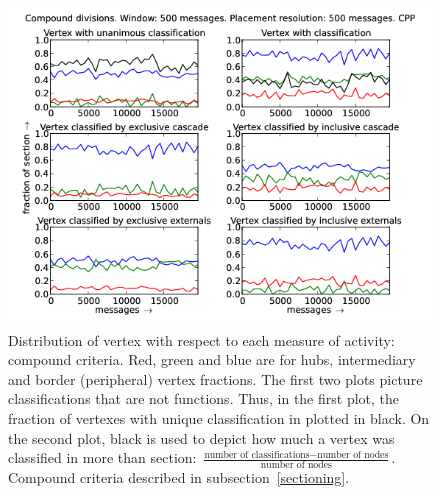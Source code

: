\documentclass[%
 aip,
 jmp,%
 amsmath,amssymb,
 reprint,%
]{revtex4-1}
\begin{document}
\begin{figure}[hbtp] 
   \centering
        \includegraphics[width=\textwidth]{figs/CPP/500_2}
    \caption{Distribution of vertex with respect to each measure of activity: compound criteria. Red, green and blue are for hubs, intermediary and border (peripheral) vertex fractions. The first two plots picture classifications that are not functions. Thus, in the first plot, the fraction of vertexes with unique classification in plotted in black. On the second plot, black is used to depict how much a vertex was classified in more than section: $\frac{\text{number of classifications} - \text{number of nodes}}{\text{number of nodes}}$. Compound criteria described in subsection~\ref{sectioning}.}
    \label{fig:cpp500_}
\end{figure}
\end{document}
